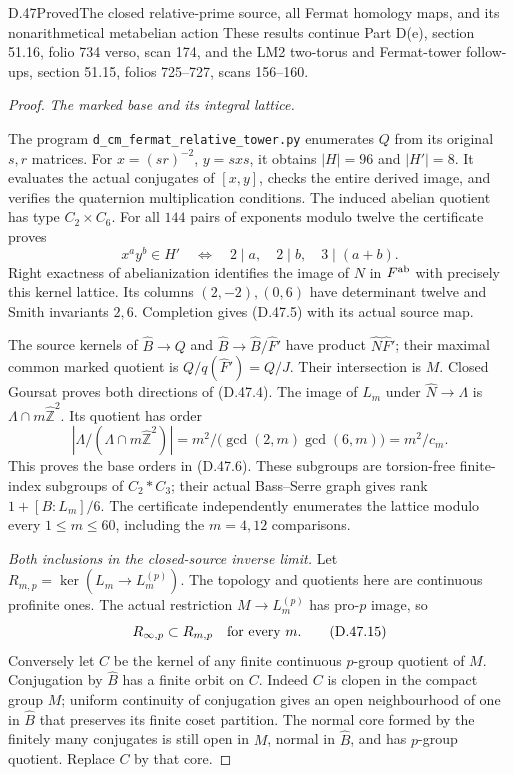 \begin{statement}{D.47}{Proved}{The closed relative-prime source, all Fermat homology maps, and its nonarithmetical metabelian action}
These results continue Part D(e), section 51.16,
folio 734 verso, scan 174, and the LM2 two-torus
and Fermat-tower follow-ups, section 51.15,
folios 725--727, scans 156--160.
\end{statement}
\begin{proof}
\emph{The marked base and its integral lattice.}

The program \texttt{d\_cm\_fermat\_relative\_tower.py}
enumerates \(Q\) from its original \(s,r\) matrices.
For \(x=(sr)^{-2}\), \(y=sxs\), it obtains
\(|H|=96\) and \(|H'|=8\).
It evaluates the actual conjugates of
\([x,y]\), checks the entire derived image,
and verifies the quaternion multiplication
conditions. The induced abelian quotient
has type \(C_2\times C_6\).
For all \(144\) pairs of exponents modulo
twelve the certificate proves
\[
          x^a y^b\in H'
        \quad\Longleftrightarrow\quad
          2\mid a,\quad2\mid b,\quad3\mid(a+b).
                                                               \tag{D.47.14}
\]
Right exactness of abelianization identifies
the image of \(N\) in \(F^{\rm ab}\)
with precisely this kernel lattice.
Its columns \((2,-2),(0,6)\) have
determinant twelve and Smith invariants
\(2,6\). Completion gives (D.47.5)
with its actual source map.

The source kernels of
\(\widehat B\to Q\) and
\(\widehat B\to\widehat B/\widehat F'\)
have product \(\widehat N\widehat F'\);
their maximal common marked quotient
is \(Q/q(\widehat F')=Q/J\).
Their intersection is \(M\).
Closed Goursat proves both directions
of (D.47.4). The image of
\(L_m\) under \(\widehat N\to\Lambda\)
is \(\Lambda\cap m\widehat{\mathbb Z}^2\).
Its quotient has order
\[
 |\Lambda/(\Lambda\cap m\widehat{\mathbb Z}^2)|
       =m^2/\bigl(\gcd(2,m)\gcd(6,m)\bigr)=m^2/c_m .
\]
This proves the base orders in
(D.47.6). These subgroups are
torsion-free finite-index subgroups
of \(C_2*C_3\); their actual
Bass--Serre graph gives
rank \(1+[B:L_m]/6\).
The certificate independently
enumerates the lattice modulo
every \(1\le m\le60\), including
the \(m=4,12\) comparisons.

\emph{Both inclusions in the closed-source inverse limit.}
Let \(R_{m,p}=\ker(L_m\to L_m^{(p)})\).
The topology and quotients here
are continuous profinite ones.
The actual restriction
\(M\to L_m^{(p)}\) has pro-\(p\)
image, so
\[
                    R_{\infty,p}\subset R_{m,p}
                              \quad\hbox{for every }m.        \tag{D.47.15}
\]
Conversely let \(C\) be the kernel
of any finite continuous
\(p\)-group quotient of \(M\).
Conjugation by \(\widehat B\)
has a finite orbit on \(C\).
Indeed \(C\) is clopen in
the compact group \(M\);
uniform continuity of
conjugation gives an open
neighbourhood of one in
\(\widehat B\) that preserves
its finite coset partition.
The normal core formed by
the finitely many conjugates
is still open in \(M\),
normal in \(\widehat B\),
and has \(p\)-group quotient.
Replace \(C\) by that core.


\end{proof}
